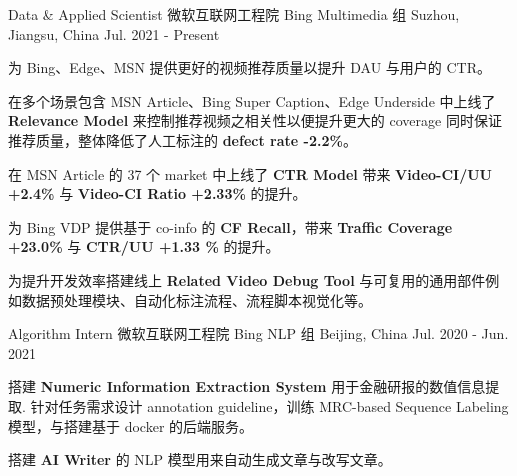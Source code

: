 

\begin{cventries}

  \cventry
    {Data \& Applied Scientist} %
    {微软互联网工程院 Bing Multimedia 组} %
    {Suzhou, Jiangsu, China} %
    {Jul. 2021 - Present} %
    {
      \begin{cvitems} %
        \item {为 Bing、Edge、MSN 提供更好的视频推荐质量以提升 DAU 与用户的 CTR。}
        \item {在多个场景包含 MSN Article、Bing Super Caption、Edge Underside 中上线了 \textbf{Relevance Model} 来控制推荐视频之相关性以便提升更大的 coverage 同时保证推荐质量，整体降低了人工标注的 \textbf{defect rate -2.2\%}。}
        \item {在 MSN Article 的 37 个 market 中上线了 \textbf{CTR Model} 带来 \textbf{Video-CI/UU +2.4\%} 与 \textbf{Video-CI Ratio +2.33\%} 的提升。}
        \item {为 Bing VDP 提供基于 co-info 的 \textbf{CF Recall}，带来 \textbf{Traffic Coverage +23.0\%} 与 \textbf{CTR/UU +1.33 \%} 的提升。}
        \item {为提升开发效率搭建线上 \textbf{Related Video Debug Tool} 与可复用的通用部件例如数据预处理模块、自动化标注流程、流程脚本视觉化等。}
      \end{cvitems}
    }

  \cventry
    {Algorithm Intern} %
    {微软互联网工程院 Bing NLP 组} %
    {Beijing, China} %
    {Jul. 2020 - Jun. 2021} %
    {
      \begin{cvitems} %
        \item {搭建 \textbf{Numeric Information Extraction System} 用于金融研报的数值信息提取. 针对任务需求设计 annotation guideline，训练 MRC-based Sequence Labeling 模型，与搭建基于 docker 的后端服务。}
        \item {搭建 \textbf{AI Writer} 的 NLP 模型用来自动生成文章与改写文章。}
      \end{cvitems}
    }


\end{cventries}
